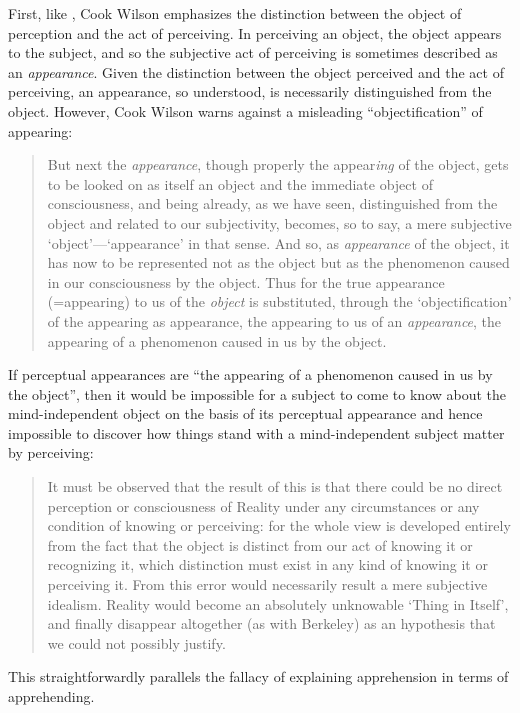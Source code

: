 \documentclass[11pt]{article}
\begin{document}
First, like \citet{Moore:1903uo}, Cook Wilson emphasizes the distinction between the object of perception and the act of perceiving. In perceiving an object, the object appears to the subject, and so the subjective act of perceiving is sometimes described as an \emph{appearance}. Given the distinction between the object perceived and the act of perceiving, an appearance, so understood, is necessarily distinguished from the object. However, Cook Wilson warns against a misleading ``objectification'' of appearing:
\begin{quote}
	But next the \emph{appearance}, though properly the appear\emph{ing} of the object, gets to be looked on as itself an object and the immediate object of consciousness, and being already, as we have seen, distinguished from the object and related to our subjectivity, becomes, so to say, a mere subjective `object'---`appearance' in that sense. And so, as \emph{appearance} of the object, it has now to be represented not as the object but as the phenomenon caused in our consciousness by the object. Thus for the true appearance (=appearing) to us of the \emph{object} is substituted, through the `objectification' of the appearing as appearance, the appearing to us of an \emph{appearance}, the appearing of a phenomenon caused in us by the object.  \citep[796]{Cook-Wilson:1926sf}
\end{quote}

If perceptual appearances are ``the appearing of a phenomenon caused in us by the object'', then it would be impossible for a subject to come to know about the mind-independent object on the basis of its perceptual appearance and hence impossible to discover how things stand with a mind-independent subject matter by perceiving:
\begin{quote}
	It must be observed that the result of this is that there could be no direct perception or consciousness of Reality under any circumstances or any condition of knowing or perceiving: for the whole view is developed entirely from the fact that the object is distinct from our act of knowing it or recognizing it, which distinction must exist in any kind of knowing it or perceiving it. From this error would necessarily result a mere subjective idealism. Reality would become an absolutely unknowable `Thing in Itself', and finally disappear altogether (as with Berkeley) as an hypothesis that we could not possibly justify. \citep[797]{Cook-Wilson:1926sf}
\end{quote}
This straightforwardly parallels the fallacy of explaining apprehension in terms of apprehending. 
\end{document}
